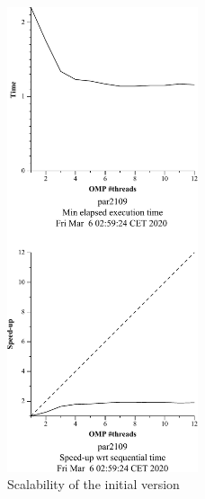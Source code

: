 \begin{figure}[H]
\centering
\begin{minipage}{.5\textwidth}
  \centering
  \includegraphics[width=0.5\textwidth]{./data/3dfft_/3dfft_omp-strong-1.pdf}
    \caption{Scalability of the initial version}%
    \label{fig:omp1-plot}
\end{minipage}%
\begin{minipage}{.5\textwidth}
  \centering

\end{minipage}
\end{figure}
